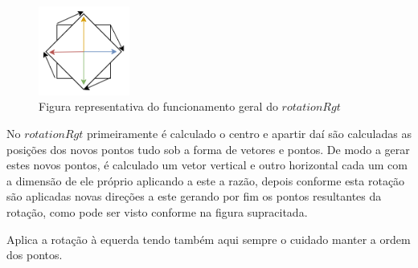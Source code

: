 \documentclass[a4paper]{article}
\newcommand{\Varid}[1]{\mathit{#1}}
\begin{document}
\begin{figure}[H]
\begin{center}
    \includegraphics[width=3cm]{rotationR} 
    \caption{Figura representativa do funcionamento geral do \ensuremath{\Varid{rotationRgt}}}
\end{center}
\end{figure}

\par No \ensuremath{\Varid{rotationRgt}} primeiramente é calculado o centro e apartir daí são calculadas as posições
dos novos pontos tudo sob a forma de vetores e pontos. De modo a gerar estes novos pontos, é calculado 
um vetor vertical e outro horizontal cada um com a dimensão de ele próprio aplicando a este a razão, depois 
conforme esta rotação são aplicadas novas direções a este gerando por fim os pontos resultantes da rotação, 
como pode ser visto conforme na figura supracitada.   
\bigbreak
\par Aplica a rotação à equerda tendo também aqui sempre o cuidado manter a ordem dos pontos.
\end{document}
